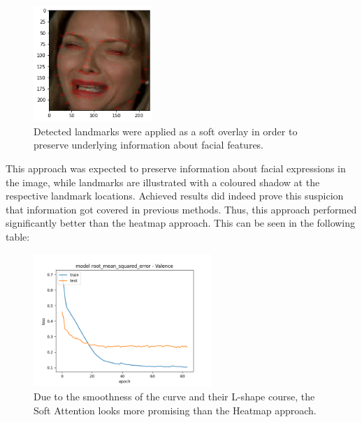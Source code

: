 \begin{figure}[H]
  \begin{center}
  \includegraphics[angle=0, width=0.4\textwidth]{Figures/landmarks_as_softOverlay.png}
  \caption{Detected landmarks were applied as a soft overlay in order to preserve underlying information about facial features.}
  \label{fig:LandmarksSoftOverlay}
  \end{center}
\end{figure}

This approach was expected to preserve information about facial expressions in the image, while landmarks are illustrated with a coloured shadow at the respective landmark locations. Achieved results did indeed prove this suspicion that information got covered in previous methods. Thus, this approach performed significantly better than the heatmap approach. This can be seen in the following table:

\begin{figure}[H]
  \begin{center}
  \includegraphics[angle=0, width=0.6\textwidth]{Figures/rmse_out1_softAttention.png}
  \caption{Due to the smoothness of the curve and their L-shape course, the Soft Attention looks more promising than the Heatmap approach.}
  \label{fig:LandmarksSoftAttention}
  \end{center}
\end{figure}


